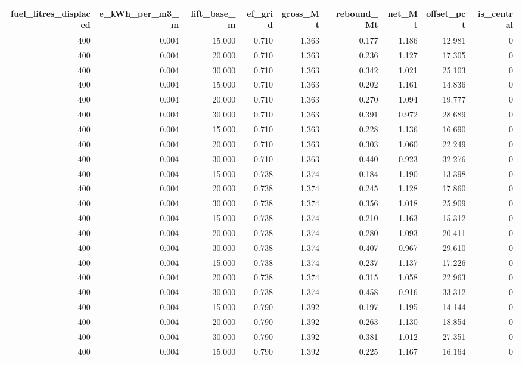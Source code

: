 \begin{tabular}{rrrrrrrrr}
\toprule
fuel_litres_displaced & e_kWh_per_m3_m & lift_base_m & ef_grid & gross_Mt & rebound_Mt & net_Mt & offset_pct & is_central \\
\midrule
400 & 0.004 & 15.000 & 0.710 & 1.363 & 0.177 & 1.186 & 12.981 & 0 \\
400 & 0.004 & 20.000 & 0.710 & 1.363 & 0.236 & 1.127 & 17.305 & 0 \\
400 & 0.004 & 30.000 & 0.710 & 1.363 & 0.342 & 1.021 & 25.103 & 0 \\
400 & 0.004 & 15.000 & 0.710 & 1.363 & 0.202 & 1.161 & 14.836 & 0 \\
400 & 0.004 & 20.000 & 0.710 & 1.363 & 0.270 & 1.094 & 19.777 & 0 \\
400 & 0.004 & 30.000 & 0.710 & 1.363 & 0.391 & 0.972 & 28.689 & 0 \\
400 & 0.004 & 15.000 & 0.710 & 1.363 & 0.228 & 1.136 & 16.690 & 0 \\
400 & 0.004 & 20.000 & 0.710 & 1.363 & 0.303 & 1.060 & 22.249 & 0 \\
400 & 0.004 & 30.000 & 0.710 & 1.363 & 0.440 & 0.923 & 32.276 & 0 \\
400 & 0.004 & 15.000 & 0.738 & 1.374 & 0.184 & 1.190 & 13.398 & 0 \\
400 & 0.004 & 20.000 & 0.738 & 1.374 & 0.245 & 1.128 & 17.860 & 0 \\
400 & 0.004 & 30.000 & 0.738 & 1.374 & 0.356 & 1.018 & 25.909 & 0 \\
400 & 0.004 & 15.000 & 0.738 & 1.374 & 0.210 & 1.163 & 15.312 & 0 \\
400 & 0.004 & 20.000 & 0.738 & 1.374 & 0.280 & 1.093 & 20.411 & 0 \\
400 & 0.004 & 30.000 & 0.738 & 1.374 & 0.407 & 0.967 & 29.610 & 0 \\
400 & 0.004 & 15.000 & 0.738 & 1.374 & 0.237 & 1.137 & 17.226 & 0 \\
400 & 0.004 & 20.000 & 0.738 & 1.374 & 0.315 & 1.058 & 22.963 & 0 \\
400 & 0.004 & 30.000 & 0.738 & 1.374 & 0.458 & 0.916 & 33.312 & 0 \\
400 & 0.004 & 15.000 & 0.790 & 1.392 & 0.197 & 1.195 & 14.144 & 0 \\
400 & 0.004 & 20.000 & 0.790 & 1.392 & 0.263 & 1.130 & 18.854 & 0 \\
400 & 0.004 & 30.000 & 0.790 & 1.392 & 0.381 & 1.012 & 27.351 & 0 \\
400 & 0.004 & 15.000 & 0.790 & 1.392 & 0.225 & 1.167 & 16.164 & 0 \\

\end{tabular}
